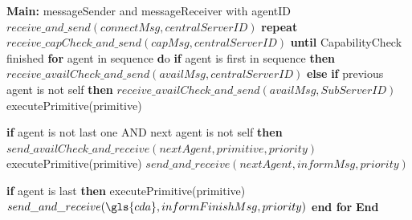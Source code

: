 \begin{breakablealgorithm}
\begin{algorithmic}[1]
   
    \State \textbf{Main:}
     messageSender and messageReceiver with agentID
    \State \qquad $receive\_and\_send(connectMsg, centralServerID)$
    \State \textbf{\qquad repeat}
    \State \qquad \qquad $receive\_capCheck\_and\_send(capMsg, centralServerID)$
    \State \textbf{\qquad until} CapabilityCheck finished  
    \State \textbf{\qquad for} agent in sequence {\textbf do}
    \State \textbf{\qquad \qquad if} {agent is first in sequence} \textbf{then}
        \State {\qquad \qquad \qquad} $receive\_availCheck\_and\_send(availMsg, centralServerID)$
        \State \textbf{\qquad \qquad else}
        \State \textbf{\qquad \qquad \qquad if} {previous agent is not self} \textbf{then}
            \State \qquad \qquad \qquad \qquad $receive\_availCheck\_and\_send(availMsg, SubServerID)$
            \State \qquad \qquad \qquad \qquad executePrimitive(primitive)
        
            \State \textbf{\qquad \qquad \qquad if} {agent is not last one AND next agent is not self} \textbf{then}
            \State \textbf{\qquad \qquad \qquad \qquad} $send\_availCheck\_and\_receive(nextAgent, primitive, priority)$
            \State \textbf{\qquad \qquad \qquad \qquad} executePrimitive(primitive)
            \State \textbf{\qquad \qquad \qquad \qquad} $send\_and\_receive(nextAgent, informMsg, priority)$
         
            \State \textbf{\qquad \qquad \qquad if} {agent is last} \textbf{then}
            \State \textbf{\qquad \qquad \qquad \qquad} executePrimitive(primitive)
            \State \textbf{\qquad \qquad \qquad \qquad} $send\_and\_receive(\gls{cda}, informFinishMsg, priority)$
            \State \textbf{\qquad end for} 
    \State \textbf{End} 
\end{algorithmic}
\end{breakablealgorithm}


